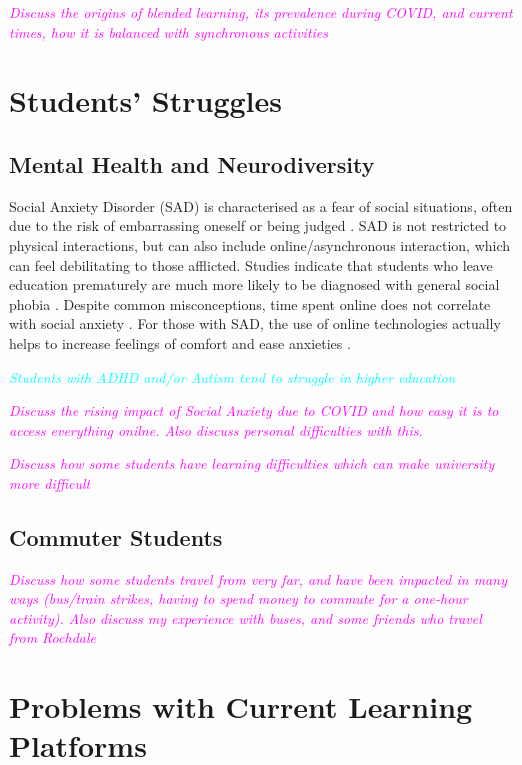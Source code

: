 \documentclass{report}
\begin{document}
\textcolor{magenta}{\textit{Discuss the origins of blended learning, its prevalence during COVID, and current times, how it is balanced with synchronous activities}}

\section{Students' Struggles}

\subsection{Mental Health and Neurodiversity}

Social Anxiety Disorder (SAD) is characterised as a fear of social situations, often due to the risk of embarrassing oneself or being judged \cite{alomari_2022_social}.
SAD is not restricted to physical interactions, but can also include online/asynchronous interaction, which can feel debilitating to those afflicted.
Studies indicate that students who leave education prematurely are much more likely to be diagnosed with general social phobia \cite{vanameringen_2003_the}.
Despite common misconceptions, time spent online does not correlate with social anxiety \cite{prizantpassal_2016_social}.
For those with SAD, the use of online technologies actually helps to increase feelings of comfort and ease anxieties \cite{prizantpassal_2016_social}.

\textcolor{cyan}{\textit{Students with ADHD and/or Autism tend to struggle in higher education \cite{clouder_2020_neurodiversity}}}

\textcolor{magenta}{\textit{Discuss the rising impact of Social Anxiety due to COVID and how easy it is to access everything onilne. Also discuss personal difficulties with this.}}

\textcolor{magenta}{\textit{Discuss how some students have learning difficulties which can make university more difficult}}

\subsection{Commuter Students}

\textcolor{magenta}{\textit{Discuss how some students travel from very far, and have been impacted in many ways (bus/train strikes, having to spend money to commute for a one-hour activity). Also discuss my experience with buses, and some friends who travel from Rochdale}}

\section{Problems with Current Learning Platforms}
\end{document}
